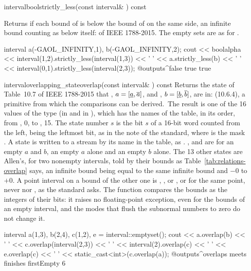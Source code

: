 \documentclass[12pt,a4paper,twoside,openright]{book}
\begin{document}
\begin{defmethod}{interval}{bool}{strictly\_less}{(const interval\& ) const}
  \begin{operation}
  \end{operation}
  Returns  if each bound of  is below the bound of
   on the same side, an infinite bound counting as below itself:
   of IEEE 1788-2015. The empty sets are as for
  .\newinvfive
\begin{example}
interval a(-GAOL_INFINITY,1), b(-GAOL_INFINITY,2);
cout << boolalpha << interval(1,2).strictly_less(interval(1,3)) << ' '
     << a.strictly_less(b) << ' '
     << interval(0,1).strictly_less(interval(2,3));
@outputs^false true true~
\end{example}
\end{defmethod}

\begin{defmethod}{interval}{overlapping\_state}{overlap}{(const interval\& ) const}
  Returns the state of Table~10.7 of IEEE 1788-2015 that , $a =
  [\underline{a}, \overline{a}]$, and , $b = [\underline{b},
  \overline{b}]$, are in:  (10.6.4), a primitive from which
  the comparisons can be derived.\newinvfive\ The result is one of the 16
  values of the type  (in  and in
  ), which has the names of the table, in its order,
  from , 0, to , 15. The state number $s$ is the
  bit $s$ of a 16-bit word counted from the left,  being the
  leftmost bit, as in the note of the standard, where  is the
  mask . A state is written to a stream by its name in the
  table, as . ,  and
   are for an empty $a$ and $b$, an empty $a$ alone and an
  empty $b$ alone. The 13 other states are Allen's, for two nonempty
  intervals, told by their bounds as Table~\ref{tab:relations-overlap} says,
  an infinite bound being equal to the same infinite bound and $-0$ to $+0$.
  A point interval on a bound of the other one is ,
  ,  or , or 
  for the same point, never  nor , as the standard
  asks. The function compares the bounds as the integers of their bits: it
  raises no floating-point exception, even for the  bounds of an
  empty interval, and the modes that flush the subnormal numbers to zero do
  not change it.
  \begin{example}
interval a(1,3), b(2,4), c(1,2), e = interval::emptyset();
cout << a.overlap(b) << ' ' << c.overlap(interval(2,3)) << ' '
     << interval(2).overlap(c) << ' ' << e.overlap(c) << ' '
     << static_cast<int>(c.overlap(a));
@outputs^overlaps meets finishes firstEmpty 6~
  \end{example}
\end{defmethod}
\end{document}

